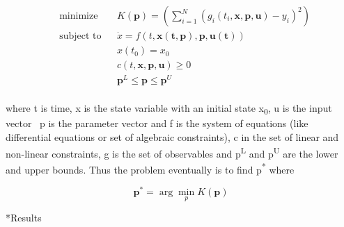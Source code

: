 \documentclass[12pt]{article}
\makeatletter
\renewcommand\section{\@startsection
	{subsection}{2}{0mm}
	{-0.2in}
	{0.05\baselineskip}
	{\normalfont\large\bfseries}}
\makeatother
\begin{document}
\begin{equation}\label{eq:static_opt}
\begin{aligned}
& \text{minimize}
& & K(\mathbf{p})=(\sum_{i=1}^N (g_i(t_i,\mathbf{x,p,u})-y_i)^2) \\
& \text{subject to}
&&\dot{x}=f(t,\mathbf{x(t,\mathbf{p}),p,u(\mathbf{t})})\\
&&&x(t_0) = x_0\\
&&&c(t,\mathbf{x,p,u}) \geqslant 0 \\
&&& \mathbf{p}^L \leqslant \mathbf{p} \leqslant \mathbf{p}^U\\
\end{aligned}
\end{equation}

where t is time, x is the state variable with an initial state x\textsubscript{0}, u is the input vector \, p is the parameter vector and f is the system of equations (like differential equations or set of algebraic constraints), c in the set of linear and non-linear constraints, g is the set of observables and p\textsuperscript{L} and p\textsuperscript{U} are the lower and upper bounds. Thus the problem eventually is to find {p}\textsuperscript{*} where 

\begin{equation}\label{eq:static_opt_2}
\mathbf{p^{*}}= \arg\min_{p} K(\mathbf{p})
\end{equation}

\section*{Results}
\end{document}
